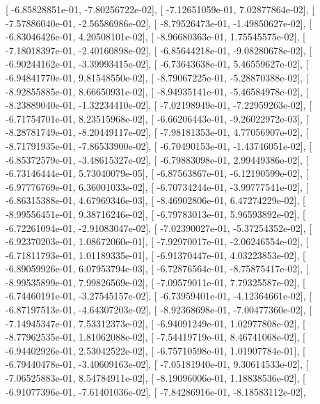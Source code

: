 \documentclass{article}
\begin{document}
       [ -6.85828851e-01,  -7.80256722e-02],
       [ -7.12651059e-01,   7.02877864e-02],
       [ -7.57886040e-01,  -2.56586986e-02],
       [ -8.79526473e-01,  -1.49850627e-02],
       [ -6.83046426e-01,   4.20508101e-02],
       [ -8.96680363e-01,   1.75545575e-02],
       [ -7.18018397e-01,  -2.40160898e-02],
       [ -6.85644218e-01,  -9.08280678e-02],
       [ -6.90244162e-01,  -3.39993415e-02],
       [ -6.73643638e-01,   5.46559627e-02],
       [ -6.94841770e-01,   9.81548550e-02],
       [ -8.79067225e-01,  -5.28870388e-02],
       [ -8.92855885e-01,   8.66650931e-02],
       [ -8.94935141e-01,  -5.46584978e-02],
       [ -8.23889040e-01,  -1.32234410e-02],
       [ -7.02198949e-01,  -7.22959263e-02],
       [ -6.71754701e-01,   8.23515968e-02],
       [ -6.66206443e-01,  -9.26022972e-03],
       [ -8.28781749e-01,  -8.20449117e-02],
       [ -7.98181353e-01,   4.77056907e-02],
       [ -8.71791935e-01,  -7.86533900e-02],
       [ -6.70490153e-01,  -1.43746051e-02],
       [ -6.85372579e-01,  -3.48615327e-02],
       [ -6.79883098e-01,   2.99449386e-02],
       [ -6.73146444e-01,   5.73040079e-05],
       [ -6.87563867e-01,  -6.12190599e-02],
       [ -6.97776769e-01,   6.36001033e-02],
       [ -6.70734244e-01,  -3.99777541e-02],
       [ -6.86315388e-01,   4.67969346e-03],
       [ -8.46902806e-01,   6.47274229e-02],
       [ -8.99556451e-01,   9.38716246e-02],
       [ -6.79783013e-01,   5.96593892e-02],
       [ -6.72261094e-01,  -2.91083047e-02],
       [ -7.02390027e-01,  -5.37254352e-02],
       [ -6.92370203e-01,   1.08672060e-01],
       [ -7.92970017e-01,  -2.06246554e-02],
       [ -6.71811793e-01,   1.01189335e-01],
       [ -6.91370447e-01,   4.03223853e-02],
       [ -6.89059926e-01,   6.07953794e-03],
       [ -6.72876564e-01,  -8.75875417e-02],
       [ -8.99535899e-01,   7.99826569e-02],
       [ -7.09579011e-01,   7.79325587e-02],
       [ -6.74460191e-01,  -3.27545157e-02],
       [ -6.73959401e-01,  -4.12364661e-02],
       [ -6.87197513e-01,  -4.64307203e-02],
       [ -8.92368698e-01,  -7.00477360e-02],
       [ -7.14945347e-01,   7.53312373e-02],
       [ -6.94091249e-01,   1.02977808e-02],
       [ -8.77962535e-01,   1.81062088e-02],
       [ -7.54419719e-01,   8.46741068e-02],
       [ -6.94402926e-01,   2.53042522e-02],
       [ -6.75710598e-01,   1.01907784e-01],
       [ -6.79440478e-01,  -3.40609163e-02],
       [ -7.05181940e-01,   9.30614533e-02],
       [ -7.06525883e-01,   8.54784911e-02],
       [ -8.19096006e-01,   1.18838536e-02],
       [ -6.91077396e-01,  -7.61401036e-02],
       [ -7.84286916e-01,  -8.18583112e-02],
\end{document}
